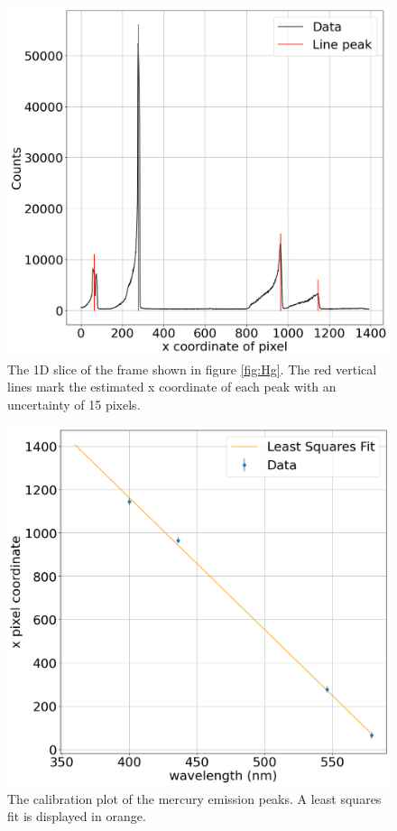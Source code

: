 \documentclass[a4paper,12pt,twocolumn]{article}
\begin{document}
		\begin{figure}
			\includegraphics[width=\columnwidth]{HgPeaks.png}
			\captionsetup{font=scriptsize}
			\caption{The 1D slice of the frame shown in figure \ref{fig:Hg}. The red vertical lines mark the estimated x coordinate of each peak with an uncertainty of 15 pixels.}
			\label{fig:HgSpectrum}
		\end{figure}
	
		\begin{figure}
			\includegraphics[width=\columnwidth]{calibration.png}
			\captionsetup{font=scriptsize}
			\caption{The calibration plot of the mercury emission peaks. A least squares fit is displayed in orange.}
			\label{fig:calibration}
		\end{figure}
		
\end{document}
